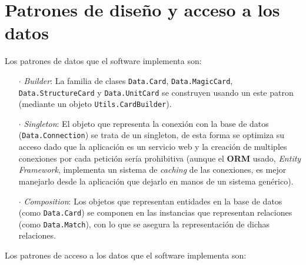 %
%
%
%
\section{Patrones de diseño y acceso a los datos}

Los patrones de datos que el software implementa son:

\begin{enumerate}
  \item[\(\cdot\)] \textit{Builder}: La familia de clases \lstinline|Data.Card|, \lstinline|Data.MagicCard|, \lstinline|Data.StructureCard| y \lstinline|Data.UnitCard| se construyen usando un este patron (mediante un objeto \lstinline|Utils.CardBuilder|).
  \item[\(\cdot\)] \textit{Singleton}: El objeto que representa la conexión con la base de datos (\lstinline|Data.Connection|) se trata de un singleton, de esta forma se optimiza su acceso dado que la aplicación es un servicio web y la creación de multiples conexiones por cada petición sería prohibitiva (aunque el \textbf{ORM} usado, \textit{Entity Framework}, implementa un sistema de \textit{caching} de las conexiones, es mejor manejarlo desde la aplicación que dejarlo en manos de un sistema genérico).
  \item[\(\cdot\)] \textit{Composition}: Los objetos que representan entidades en la base de datos (como \lstinline|Data.Card|) se componen en las instancias que representan relaciones (como \lstinline|Data.Match|), con lo que se asegura la representación de dichas relaciones.
\end{enumerate}

Los patrones de acceso a los datos que el software implementa son:

